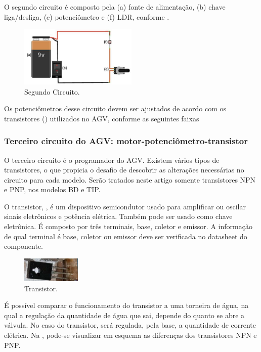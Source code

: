 \documentclass{textolivre-html}
\begin{document}
O segundo circuito é composto pela (a) fonte de alimentação, (b) chave
liga/desliga, (e) potenciômetro e (f) LDR, conforme .

\begin{figure}[htbp]
\centering
\includegraphics[width=0.5\textwidth]{figure-16.pdf}
\caption{Segundo Circuito.}
\label{fig10}
\end{figure}

Os potenciômetros desse circuito devem ser ajustados de acordo com os
transistores () utilizados no AGV, conforme as seguintes faixas


\FloatBarrier 

\subsubsection{Terceiro circuito do AGV: motor-potenciômetro-transistor}\label{sec-terceiro-circ}
O terceiro circuito é o programador do AGV. Existem vários tipos de
transistores, o que propicia o desafio de descobrir as alterações necessárias
no circuito para cada modelo. Serão tratados neste artigo somente transistores
NPN e PNP, nos modelos BD e TIP.

O transistor, , é um dispositivo semicondutor usado para amplificar ou
oscilar sinais eletrônicos e potência elétrica. Também pode ser usado como
chave eletrônica. É composto por três terminais, base, coletor e emissor. A
informação de qual terminal é base, coletor ou emissor deve ser verificada no
datasheet do componente.

\begin{figure}[htbp]
\centering
\includegraphics[width=0.25\textwidth]{figure-17.pdf}
\caption{Transistor.}
\label{fig11}
\end{figure}

É possível comparar o funcionamento do transistor a uma torneira de água, na
qual a regulação da quantidade de água que sai, depende do quanto se abre a
válvula. No caso do transistor, será regulada, pela base, a quantidade de
corrente elétrica. Na , pode-se visualizar em esquema as diferenças
dos transistores NPN e PNP.
\end{document}
